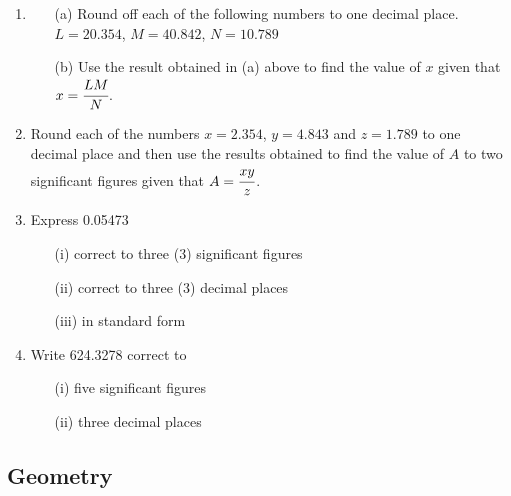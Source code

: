 \begin{enumerate}
	 \item 
	 	\begin{itemize}
	 	\item[(a)] Round off each of the following numbers to one decimal place. $L = 20.354$, $M = 40.842$, $N = 10.789$
	 	\item[(b)] Use the result obtained in (a) above to find the value of $x$ given that $x = \cfrac{LM}{N}$.
	 	\end{itemize}
	 	
	\item Round each of the numbers $x = 2.354$, $y = 4.843$ and $z = 1.789$ to one decimal place and then use the results obtained to find the value of $A$ to two significant figures given that $A = \cfrac{xy}{z}$.
	 
	\item Express 0.05473
		\begin{itemize}
		\item[(i)] correct to three (3) significant figures
		\item[(ii)] correct to three (3) decimal places
		\item[(iii)] in standard form
		\end{itemize}
	
	\item Write 624.3278 correct to
		\begin{itemize}
		\item[(i)] five significant figures
		\item[(ii)] three decimal places
		\end{itemize}



\end{enumerate}	

	\subsection{Geometry}
	
